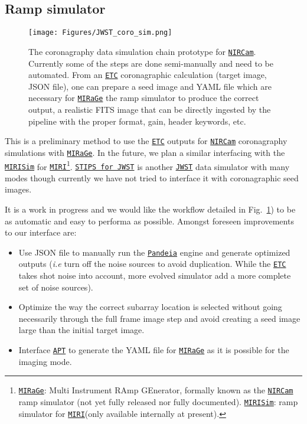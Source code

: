 \documentclass[]{spie}  %
\newcommand{\todo}[1]{\textcolor{red}{[#1]}}
\newcommand{\jwst}{{\tt \href{https://jwst.stsci.edu}{JWST}}\xspace}
\newcommand{\nircam}{{\tt \href{https://jwst.stsci.edu/instrumentation/nircam}{NIRCam}}\xspace}
\newcommand{\miri}{{\tt \href{https://jwst.stsci.edu/instrumentation/miri}{MIRI}}\xspace}
\newcommand{\etc}{{\tt \href{https://jwst.etc.stsci.edu/}{ETC}}\xspace}
\newcommand{\apt}{{\tt \href{http://www.stsci.edu/hst/proposing/apt}{APT}}\xspace}
\newcommand{\pandeia}{{\tt \href{https://pypi.org/project/pandeia.engine/}{Pandeia}}\xspace}
\newcommand{\stips}{{\tt \href{https://jwst.stsci.edu/science-planning/proposal-planning-toolbox/image-and-spectroscopy-simulator}{STIPS for JWST}}\xspace}
\newcommand{\mirage}{{\tt \href{https://github.com/spacetelescope/mirage}{MIRaGe}}\xspace}%
\newcommand{\mirisim}{{\tt \href{http://miri.ster.kuleuven.be/bin/view/Internal/Software/MIRISim}{MIRISim}}\xspace}
\def\begini{\begin{itemize}[itemsep=0.5pt,topsep=0.5pt]}
\def\endi{\end{itemize}}
\begin{document}
\subsection{Ramp simulator}
\label{sec:ramp}

\begin{figure}[h!]
\begin{center}
\texttt{[image: Figures/JWST\_coro\_sim.png]}
\caption{The coronagraphy data simulation chain prototype for \nircam. Currently some of the steps are done semi-manually and need to be automated. From an \etc coronagraphic calculation (target image, JSON file), one can prepare a seed image and YAML file which are necessary for \mirage the ramp simulator to produce the correct output, a realistic FITS image that can be directly ingested by the pipeline with the proper format, gain, header keywords, etc.}
\label{fig:jwst-sim}
\end{center}
\end{figure}

This is a preliminary method to use the \etc outputs for \nircam coronagraphy simulations with \mirage. In the future, we plan a similar interfacing with the \mirisim for \miri\footnote{\mirage: Multi Instrument RAmp GEnerator, formally known as the \nircam ramp simulator (not yet fully released nor fully documented). \mirisim: ramp simulator for \miri (only available internally at present).}. \stips is another \jwst data simulator with many modes though currently we have not tried to interface it with coronagraphic seed images.

It is a work in progress and we would like the workflow detailed in Fig.~\ref{fig:jwst-sim}) to be as automatic and easy to performa as possible. Amongst foreseen improvements to our interface are:
\begini
\item Use JSON file to manually run the \pandeia engine and generate optimized outputs ({\em i.e} turn off the noise sources to avoid duplication. While the \etc takes shot noise into account, more evolved simulator add a more complete set of noise sources).
\item Optimize the way the correct subarray location is selected without going necessarily through the full frame image step and avoid creating a seed image large than the initial target image. 
\item Interface \apt to generate the YAML file for \mirage as it is possible for the imaging mode.
\endi

\end{document}
